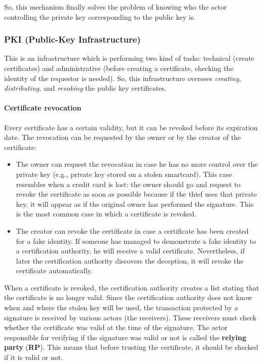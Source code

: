 So, this mechanism finally solves the problem of knowing who the actor controlling the private key corresponding to the public key is.

\subsubsection{PKI (Public-Key Infrastructure)}
This is an infrastructure which is performing two kind of tasks: technical (create certificates) and
administrative (before creating a certificate, checking the identity of the requestor is needed).
So, this infrastructure oversees \textit{creating}, \textit{distributing}, and \textit{revoking} the public key certificates.


\paragraph{Certificate revocation}
Every certificate has a certain validity, but it can be revoked before its expiration date. The revocation can be requested by the owner or by the creator of the certificate:

\begin{itemize}
	\item The owner can request the revocation in case he has no more control over the private key (e.g., private key stored on a stolen smartcard).
	      This case resembles when a credit card is lost: the owner should go and request to revoke the certificate as soon as possible because if the thief uses that private key, it will appear as if the original owner has performed the signature. This is the most common case in which a certificate is revoked.

	\item The creator can revoke the certificate in case a certificate has been created for a fake identity. If someone has managed to demonstrate a fake identity to a certification authority, he will receive a valid certificate. Nevertheless, if later the certification authority discovers the deception, it will revoke the certificate automatically.
\end{itemize}

When a certificate is revoked, the certification authority creates a list stating that the certificate is no longer valid. Since the certification authority does not know when and where the stolen key will be used, the transaction protected by a signature is received by various actors (the receivers). These receivers must check whether the certificate was valid at the time of the signature. The actor responsible for verifying if the signature was valid or not is called the \textbf{relying party} (\textbf{RP}).
This means that before trusting the certificate, it should be checked if it is valid or not.

